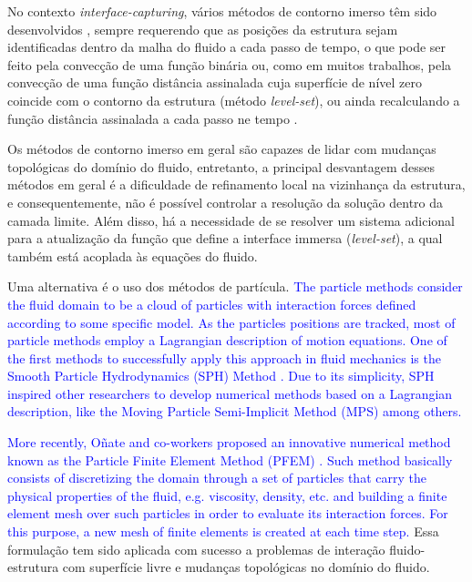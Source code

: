 \documentclass[_ArquivoPrincipal.tex]{subfiles}
\begin{document}
No contexto \textit{interface-capturing}, vários métodos de contorno imerso têm sido desenvolvidos \cite{FLD:FLD2556}, sempre requerendo que as posições da estrutura sejam identificadas dentro da malha do fluido a cada passo de tempo, o que pode ser feito pela convecção de uma função binária \cite{ HIRT1981201, CERRONI2018646} ou, como em muitos trabalhos, pela convecção de uma função distância assinalada cuja superfície de nível zero coincide com o contorno da estrutura (método \textit{level-set}), ou ainda recalculando a função distância assinalada a cada passo ne tempo \cite{cirakrad2005,SanchesC:2014, AkkermanBBFK:2011}. 

Os métodos de contorno imerso em geral são capazes de lidar com mudanças topológicas do domínio do fluido, entretanto, a principal desvantagem desses métodos em geral é a dificuldade de refinamento local na vizinhança da estrutura, e consequentemente, não é possível controlar a resolução da solução dentro da camada limite. Além disso, há a necessidade de se resolver um sistema adicional para a atualização da função que define a interface immersa (\textit{level-set}), a qual também está acoplada às equações do fluido.

Uma alternativa é o uso dos métodos de partícula. \textcolor{blue}{The particle methods consider the fluid domain to be a cloud of
particles with interaction forces defined according to some specific
model. As the particles positions are tracked, most of particle methods
employ a Lagrangian description of motion equations. One of the first
methods to successfully apply this approach in fluid mechanics is the
Smooth Particle Hydrodynamics (SPH) Method
\cite{GingoldM:1977,RandlesL:1996,Monaghan:1994,LiuLLZ:2003}. Due to its
simplicity, SPH inspired other researchers to develop numerical methods
based on a Lagrangian description, like the Moving Particle
Semi-Implicit Method (MPS) \cite{KoshizukaO:1996} among others.}

\textcolor{blue}{More
recently, Oñate and co-workers proposed an innovative numerical method
known as the Particle Finite Element Method (PFEM)
\cite{IdelsohnOP:2004, IdelsohnOPC:2006, FranciOC:2016}. Such method
basically consists of discretizing the domain through a set of particles
that carry the physical properties of the fluid, e.g. viscosity,
density, etc. and building a finite element mesh over such particles in
order to evaluate its interaction forces. For this purpose, a new mesh
of finite elements is created at each time step.} Essa formulação tem sido aplicada com sucesso a problemas de interação fluido-estrutura com superfície livre e mudanças topológicas no domínio do fluido.
\end{document}
